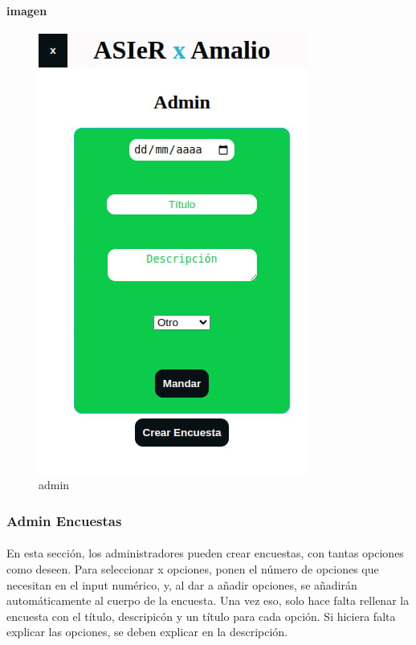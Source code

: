 \documentclass[a4paper]{article}
\begin{document}
\paragraph{imagen}
 \begin{figure}[ht]
    \includegraphics[scale=0.5]{./assets/admin.jpg}
    \centering
    \caption{admin}
    \label{fig:admin}
 \end{figure}
 \newpage
 \subsubsection[/app/admin/encuestas]{Admin Encuestas}
 \paragraph{}
 En esta sección, los administradores pueden crear encuestas, con tantas opciones como deseen.
 Para seleccionar x opciones, ponen el número de opciones que necesitan en el input numérico, y,
 al dar a añadir opciones, se añadirán automáticamente al cuerpo de la encuesta.
 Una vez eso, solo hace falta rellenar la encuesta con el título, descripicón y un título 
 para cada opción. Si hiciera falta explicar las opciones, se deben explicar en la descripción.
\end{document}
